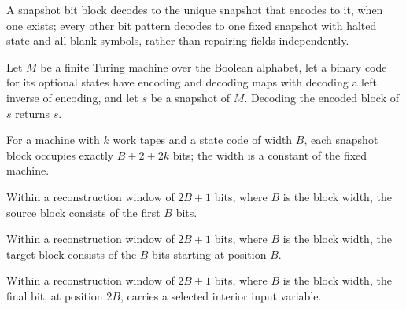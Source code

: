 \begin{definition}
\label{Complexity.clBlockDecode}
\leanok
{}
A snapshot bit block decodes to the unique snapshot that encodes to it, when one exists; every other bit pattern decodes to one fixed snapshot with halted state and all-blank symbols, rather than repairing fields independently.
\end{definition}

\begin{lemma}
\label{Complexity.clBlockDecode_encode}
\leanok
{}
Let $M$ be a finite Turing machine over the Boolean alphabet, let a binary code for its
optional states have encoding and decoding maps with decoding a left inverse of
encoding, and let $s$ be a snapshot of $M$. Decoding the encoded block of $s$ returns
$s$.
\end{lemma}

\begin{definition}
\label{Complexity.clWidth}
\leanok
{}
For a machine with $k$ work tapes and a state code of width $B$, each snapshot block occupies exactly $B + 2 + 2k$ bits; the width is a constant of the fixed machine.
\end{definition}

\begin{definition}
\label{Complexity.clSourceBits}
\leanok
Within a reconstruction window of $2B+1$ bits, where $B$ is the block width, the source block consists of the first $B$ bits.
\end{definition}

\begin{definition}
\label{Complexity.clTargetBits}
\leanok
Within a reconstruction window of $2B+1$ bits, where $B$ is the block width, the target block consists of the $B$ bits starting at position $B$.
\end{definition}

\begin{definition}
\label{Complexity.clWindowBit}
\leanok
Within a reconstruction window of $2B+1$ bits, where $B$ is the block width, the final bit, at position $2B$, carries a selected interior input variable.
\end{definition}

